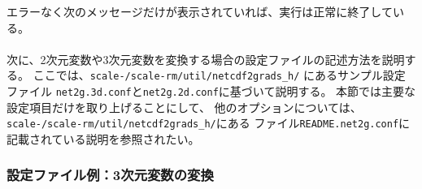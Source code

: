 エラーなく次のメッセージだけが表示されていれば、実行は正常に終了している。\\

\\

次に、2次元変数や3次元変数を変換する場合の設定ファイルの記述方法を説明する。
ここでは、\texttt{scale-\version/scale-rm/util/netcdf2grads\_h/} にあるサンプル設定ファイル
\verb|net2g.3d.conf|と\verb|net2g.2d.conf|に基づいて説明する。
本節では主要な設定項目だけを取り上げることにして、
他のオプションについては、\texttt{scale-\version/scale-rm/util/netcdf2grads\_h/}にある
ファイル\verb|README.net2g.conf|に記載されている説明を参照されたい。


\subsubsection{設定ファイル例：3次元変数の変換}

